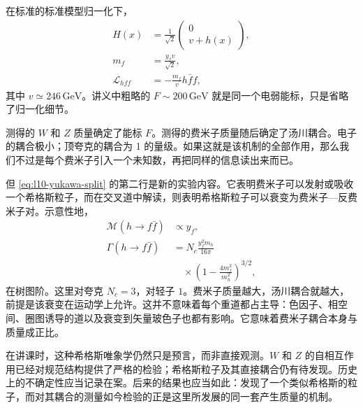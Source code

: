 在标准的标准模型归一化下，
\begin{equation}
\begin{aligned}
  H(x)&=\frac{1}{\sqrt2}
  \begin{pmatrix}
    0\\ v+h(x)
  \end{pmatrix},
  \\
  m_f&=\frac{y_fv}{\sqrt2},
  \\
  \mathcal L_{hff}&=-\frac{m_f}{v}h\bar f f,
\end{aligned}
  \label{eq:l10-standard-higgs-normalization}
\end{equation}
其中 \(v\simeq246\,\mathrm{GeV}\)。讲义中粗略的
\(F\sim200\,\mathrm{GeV}\) 就是同一个电弱能标，只是省略了归一化细节。

测得的 \(W\) 和 \(Z\) 质量确定了能标 \(F\)。测得的费米子质量随后确定了汤川耦合。电子的耦合极小；顶夸克的耦合为 1 的量级。如果这就是该机制的全部作用，那么我们不过是每个费米子引入一个未知数，再把同样的信息读出来而已。

但 \eqref{eq:l10-yukawa-split} 的第二行是新的实验内容。它表明费米子可以发射或吸收一个希格斯粒子，而在交叉道中解读，则表明希格斯粒子可以衰变为费米子—反费米子对。示意性地，
\begin{equation}
\begin{aligned}
  \mathcal M(h\to f\bar f)&\propto y_f,
  \\
  \Gamma(h\to f\bar f)
  &=
  N_c\frac{y_f^2m_h}{16\pi}
  \\
  &\quad\times
  \left(1-\frac{4m_f^2}{m_h^2}\right)^{3/2},
\end{aligned}
  \label{eq:l10-higgs-fermion-width}
\end{equation}
在树图阶。这里对夸克 \(N_c=3\)，对轻子 \(1\)。费米子质量越大，汤川耦合就越大，前提是该衰变在运动学上允许。这并不意味着每个重道都占主导：色因子、相空间、圈图诱导的道以及衰变到矢量玻色子也都有影响。它意味着费米子耦合本身与质量成正比。

\begin{classroomqa}
\end{classroomqa}

在讲课时，这种希格斯唯象学仍然只是预言，而非直接观测。\(W\) 和 \(Z\) 的自相互作用已经对规范结构提供了严格的检验；希格斯粒子及其直接耦合仍有待发现。历史上的不确定性应当记录在案。后来的结果也应当如此：发现了一个类似希格斯的粒子，而对其耦合的测量如今检验的正是这里所发展的同一套产生质量的机制。

